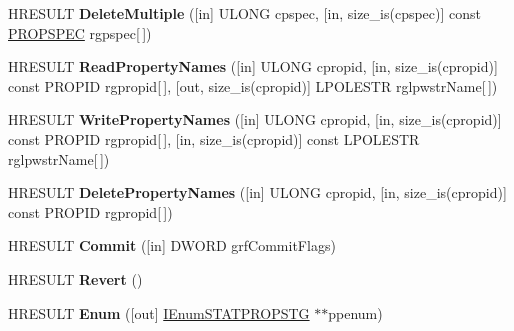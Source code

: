 \begin{DoxyCompactItemize}
H\+R\+E\+S\+U\+LT {\bfseries Delete\+Multiple} (\mbox{[}in\mbox{]} U\+L\+O\+NG cpspec, \mbox{[}in, size\+\_\+is(cpspec)\mbox{]} const \hyperlink{struct_i_property_storage_1_1tag_p_r_o_p_s_p_e_c}{P\+R\+O\+P\+S\+P\+EC} rgpspec\mbox{[}$\,$\mbox{]})
\item 
\mbox{\label{interface_i_property_storage_aa097003bcb54d6a97ddd06096f0262a7}} 
H\+R\+E\+S\+U\+LT {\bfseries Read\+Property\+Names} (\mbox{[}in\mbox{]} U\+L\+O\+NG cpropid, \mbox{[}in, size\+\_\+is(cpropid)\mbox{]} const P\+R\+O\+P\+ID rgpropid\mbox{[}$\,$\mbox{]}, \mbox{[}out, size\+\_\+is(cpropid)\mbox{]} L\+P\+O\+L\+E\+S\+TR rglpwstr\+Name\mbox{[}$\,$\mbox{]})
\item 
\mbox{\label{interface_i_property_storage_a8834c7ec54b588ea7052657035a8b956}} 
H\+R\+E\+S\+U\+LT {\bfseries Write\+Property\+Names} (\mbox{[}in\mbox{]} U\+L\+O\+NG cpropid, \mbox{[}in, size\+\_\+is(cpropid)\mbox{]} const P\+R\+O\+P\+ID rgpropid\mbox{[}$\,$\mbox{]}, \mbox{[}in, size\+\_\+is(cpropid)\mbox{]} const L\+P\+O\+L\+E\+S\+TR rglpwstr\+Name\mbox{[}$\,$\mbox{]})
\item 
\mbox{\label{interface_i_property_storage_aaa74de33d4aa9a5fbbb39f53374fd389}} 
H\+R\+E\+S\+U\+LT {\bfseries Delete\+Property\+Names} (\mbox{[}in\mbox{]} U\+L\+O\+NG cpropid, \mbox{[}in, size\+\_\+is(cpropid)\mbox{]} const P\+R\+O\+P\+ID rgpropid\mbox{[}$\,$\mbox{]})
\item 
\mbox{\label{interface_i_property_storage_ab34efd457560a1febedf10f7b76700cd}} 
H\+R\+E\+S\+U\+LT {\bfseries Commit} (\mbox{[}in\mbox{]} D\+W\+O\+RD grf\+Commit\+Flags)
\item 
\mbox{\label{interface_i_property_storage_a46b35ffabde797ede21e4fbd7f57b500}} 
H\+R\+E\+S\+U\+LT {\bfseries Revert} ()
\item 
\mbox{\label{interface_i_property_storage_a3936eeac169e39c9353d432811c6c847}} 
H\+R\+E\+S\+U\+LT {\bfseries Enum} (\mbox{[}out\mbox{]} \hyperlink{interface_i_enum_s_t_a_t_p_r_o_p_s_t_g}{I\+Enum\+S\+T\+A\+T\+P\+R\+O\+P\+S\+TG} $\ast$$\ast$ppenum)
\item 
\mbox{\label{interface_i_property_storage_a53b372d40be5f9948b8b4c5824a34982}} 
$$
\end{DoxyCompactItemize}
